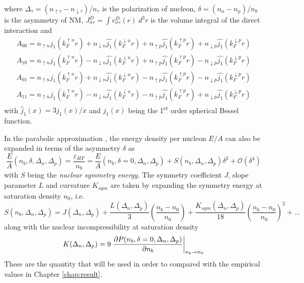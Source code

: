 where $\Delta_{\tau} = (n_{\uparrow \tau} - n_{\downarrow \tau})/n_{\tau}$ is the polarization of nucleon, $\delta = (n_n - n_p)/n_b$ is the asymmetry of \gls{NM}, $J^D_{\sigma\tau} = \int v^D_{\sigma\tau}(r)\: d^3 r$ is the volume integral of the direct interaction and
\begin{equation}
        \begin{array}{l}
                A_{00} = n_{\uparrow n} \hat{j_1}(k_F^{\uparrow n} r) + n_{\downarrow n} \hat{j_1}(k_F^{\downarrow n} r) + n_{\uparrow p} \hat{j_1}(k_F^{\uparrow p} r) + n_{\downarrow p} \hat{j_1}(k_F^{\downarrow p} r)\\[5pt]
                A_{10} = n_{\uparrow n} \hat{j_1}(k_F^{\uparrow n} r) - n_{\downarrow n} \hat{j_1}(k_F^{\downarrow n} r) + n_{\uparrow p} \hat{j_1}(k_F^{\uparrow p} r) - n_{\downarrow p} \hat{j_1}(k_F^{\downarrow p} r)\\[5pt]
                A_{01} = n_{\uparrow n} \hat{j_1}(k_F^{\uparrow n} r) + n_{\downarrow n} \hat{j_1}(k_F^{\downarrow n} r) - n_{\uparrow p} \hat{j_1}(k_F^{\uparrow p} r) - n_{\downarrow p} \hat{j_1}(k_F^{\downarrow p} r)\\[5pt]
                A_{11} = n_{\uparrow n} \hat{j_1}(k_F^{\uparrow n} r) - n_{\downarrow n} \hat{j_1}(k_F^{\downarrow n} r) - n_{\uparrow p} \hat{j_1}(k_F^{\uparrow p} r) + n_{\downarrow p} \hat{j_1}(k_F^{\downarrow p} r)
        \end{array}
\end{equation}
with $\hat{j}_1(x)=3j_1(x)/x$ and $j_1(x)$ being the 1\textsuperscript{st} order spherical Bessel function.\par
In the parabolic approximation \citep{khoa1996study}, the energy density per nucleon $E/A$ can also be expanded in terms of the asymmetry $\delta$ as
\begin{equation}
    \frac{E}{A} (n_b, \delta, \Delta_n, \Delta_p) = \frac{\varepsilon_{HF}}{n_b} = \frac{E}{A} (n_b, \delta=0, \Delta_n, \Delta_p) + S(n_b, \Delta_n, \Delta_p)\delta^2 + \mathcal{O}(\delta^4)
    \label{eq:S}
\end{equation}
with $S$ being the \emph{nuclear symmetry energy}. The symmetry coefficient $J$, slope parameter $L$ and curvature $K_{sym}$ are taken by expanding the symmetry energy at saturation density $n_0$, i.e. \citep{tan2020spin,li2008recent,horowitz2014way,lattimer2014symmetry}
\begin{equation}
    S(n_b, \Delta_n, \Delta_p) = J(\Delta_n, \Delta_p) + \frac{L(\Delta_n, \Delta_p)}{3} \left( \frac{n_b - n_0}{n_0} \right) + \frac{K_{sym}(\Delta_n, \Delta_p)}{18} \left( \frac{n_b - n_0}{n_0} \right)^2 + \ldots
    \label{eq:pars}
\end{equation}
along with the nuclear incompressibility at saturation density
\begin{equation}
    K(\Delta_n, \Delta_p) = 9 \left.\pdv{P(n_b, \delta=0,\Delta_n,\Delta_p)}{n_b}\right|_{n_b \to n_0}
        \label{eq:K}
\end{equation}
These are the quantity that will be used in order to compared with the empirical values in Chapter \ref{chap:result}.

